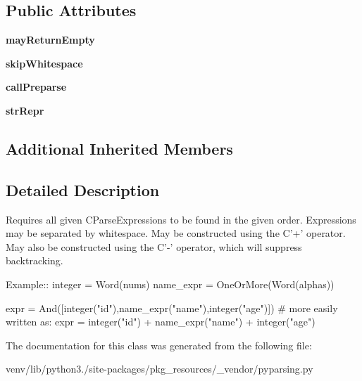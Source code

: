 \subsection*{Public Attributes}
\begin{DoxyCompactItemize}
\item 
\mbox{\label{classpkg__resources_1_1__vendor_1_1pyparsing_1_1_and_aba58fe973f21ac96599ac331a0b3aad1}} 
{\bfseries may\+Return\+Empty}
\item 
\mbox{\label{classpkg__resources_1_1__vendor_1_1pyparsing_1_1_and_a0f47b9ca84f6db58d94518eb7915025c}} 
{\bfseries skip\+Whitespace}
\item 
\mbox{\label{classpkg__resources_1_1__vendor_1_1pyparsing_1_1_and_a8c7a814824b65bf36e6b56e11dc19545}} 
{\bfseries call\+Preparse}
\item 
\mbox{\label{classpkg__resources_1_1__vendor_1_1pyparsing_1_1_and_a47534db1df0f80837e6a0692e273baf8}} 
{\bfseries str\+Repr}
\end{DoxyCompactItemize}
\subsection*{Additional Inherited Members}


\subsection{Detailed Description}
\begin{DoxyVerb}Requires all given C{ParseExpression}s to be found in the given order.
Expressions may be separated by whitespace.
May be constructed using the C{'+'} operator.
May also be constructed using the C{'-'} operator, which will suppress backtracking.

Example::
    integer = Word(nums)
    name_expr = OneOrMore(Word(alphas))

    expr = And([integer("id"),name_expr("name"),integer("age")])
    # more easily written as:
    expr = integer("id") + name_expr("name") + integer("age")
\end{DoxyVerb}
 

The documentation for this class was generated from the following file\+:\begin{DoxyCompactItemize}
\item 
venv/lib/python3./site-\/packages/pkg\+\_\+resources/\+\_\+vendor/pyparsing.\+py\end{DoxyCompactItemize}
